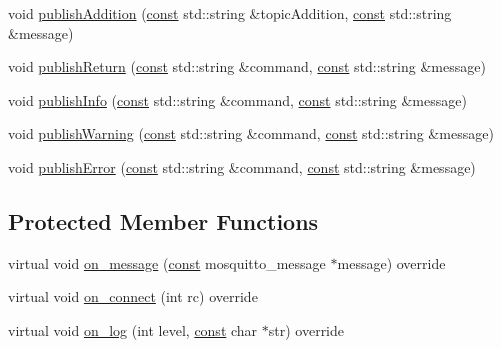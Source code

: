 \begin{DoxyCompactItemize}
\item 
void \hyperlink{class_command_processor_a88ad204c02a79887698c6abc93729a2d}{publish\+Addition} (\hyperlink{functions__c_8js_afacfd9c985d225bb07483b887a801b6f}{const} std\+::string \&topic\+Addition, \hyperlink{functions__c_8js_afacfd9c985d225bb07483b887a801b6f}{const} std\+::string \&message)
\item 
void \hyperlink{class_command_processor_ae97c2e58deecce8bd6dac0d081d73f03}{publish\+Return} (\hyperlink{functions__c_8js_afacfd9c985d225bb07483b887a801b6f}{const} std\+::string \&command, \hyperlink{functions__c_8js_afacfd9c985d225bb07483b887a801b6f}{const} std\+::string \&message)
\item 
void \hyperlink{class_command_processor_a0f5c17ab23203abee8a48c82f3338a28}{publish\+Info} (\hyperlink{functions__c_8js_afacfd9c985d225bb07483b887a801b6f}{const} std\+::string \&command, \hyperlink{functions__c_8js_afacfd9c985d225bb07483b887a801b6f}{const} std\+::string \&message)
\item 
void \hyperlink{class_command_processor_a0691a985030ebb0cef833aa779bedeab}{publish\+Warning} (\hyperlink{functions__c_8js_afacfd9c985d225bb07483b887a801b6f}{const} std\+::string \&command, \hyperlink{functions__c_8js_afacfd9c985d225bb07483b887a801b6f}{const} std\+::string \&message)
\item 
void \hyperlink{class_command_processor_a81e3fda8d03c8f5aea99a442ebdb0050}{publish\+Error} (\hyperlink{functions__c_8js_afacfd9c985d225bb07483b887a801b6f}{const} std\+::string \&command, \hyperlink{functions__c_8js_afacfd9c985d225bb07483b887a801b6f}{const} std\+::string \&message)
\end{DoxyCompactItemize}
\subsection*{Protected Member Functions}
\begin{DoxyCompactItemize}
\item 
virtual void \hyperlink{class_command_processor_ab1a2cf5d74c8bbd9bbcf57c7a4b14c66}{on\+\_\+message} (\hyperlink{functions__c_8js_afacfd9c985d225bb07483b887a801b6f}{const} mosquitto\+\_\+message $\ast$message) override
\item 
virtual void \hyperlink{class_command_processor_a242db95796f5dd1b17a139ed19d6ecfa}{on\+\_\+connect} (int rc) override
\item 
virtual void \hyperlink{class_command_processor_a7300ca2e9cd0237f17ce82f64123e553}{on\+\_\+log} (int level, \hyperlink{functions__c_8js_afacfd9c985d225bb07483b887a801b6f}{const} char $\ast$str) override
\end{DoxyCompactItemize}
